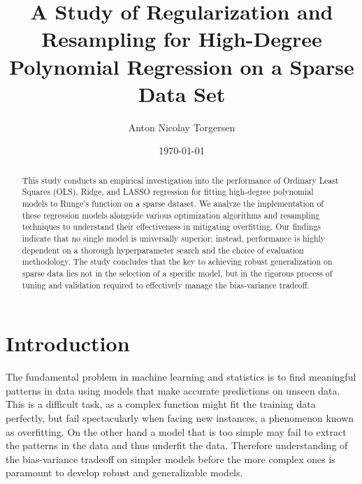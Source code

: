 \documentclass[twocolumn,aps]{revtex4}
\begin{document}
\title{A Study of Regularization and Resampling for High-Degree Polynomial Regression on a Sparse Data Set}
\date{\today}               
\author{
    Anton Nicolay Torgersen 
}


\newpage



    \begin{abstract}
This study conducts an empirical investigation into the performance of Ordinary Least Squares (OLS), Ridge, and LASSO regression for fitting high-degree polynomial models to Runge's function on a sparse dataset. We analyze the implementation of these regression models alongside various optimization algorithms and resampling techniques to understand their effectiveness in mitigating overfitting. Our findings indicate that no single model is universally superior; instead, performance is highly dependent on a thorough hyperparameter search and the choice of evaluation methodology. The study concludes that the key to achieving robust generalization on sparse data lies not in the selection of a specific model, but in the rigorous process of tuning and validation required to effectively manage the bias-variance tradeoff.
\end{abstract}


    \maketitle
    \thispagestyle{empty} %

    


\section{Introduction}

The fundamental problem in machine learning and statistics is to find meaningful patterns in data using models that make accurate predictions on unseen data.
This is a difficult task, as a complex function might fit the training data perfectly, but fail spectacularly when facing new instances, a phenomenon known as overfitting.
On the other hand a model that is too simple may fail to extract the patterns in the data and thus underfit the data.
Therefore understanding of the bias-variance tradeoff on simpler models before the more complex ones is paramount to develop robust and generalizable models.
\end{document}
